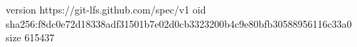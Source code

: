 version https://git-lfs.github.com/spec/v1
oid sha256:f8dc0e72d18338adf31501b7e02d0cb3323200b4c9e80bfb30588956116c33a0
size 615437
